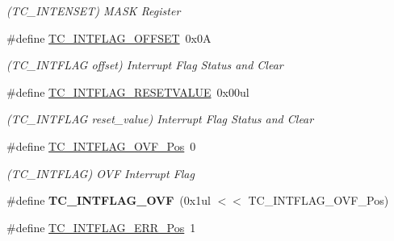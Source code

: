 \begin{DoxyCompactItemize}
\begin{DoxyCompactList}\small\item\em (T\+C\+\_\+\+I\+N\+T\+E\+N\+S\+E\+T) M\+A\+S\+K Register \end{DoxyCompactList}\item 
\hypertarget{group___s_a_m_l21___t_c_ga82798e90146a8ab84dce2f0885671f99}{}\#define \hyperlink{group___s_a_m_l21___t_c_ga82798e90146a8ab84dce2f0885671f99}{T\+C\+\_\+\+I\+N\+T\+F\+L\+A\+G\+\_\+\+O\+F\+F\+S\+E\+T}~0x0\+A\label{group___s_a_m_l21___t_c_ga82798e90146a8ab84dce2f0885671f99}

\begin{DoxyCompactList}\small\item\em (T\+C\+\_\+\+I\+N\+T\+F\+L\+A\+G offset) Interrupt Flag Status and Clear \end{DoxyCompactList}\item 
\hypertarget{group___s_a_m_l21___t_c_ga8756d3d09dc60b72e74b9850c06b3643}{}\#define \hyperlink{group___s_a_m_l21___t_c_ga8756d3d09dc60b72e74b9850c06b3643}{T\+C\+\_\+\+I\+N\+T\+F\+L\+A\+G\+\_\+\+R\+E\+S\+E\+T\+V\+A\+L\+U\+E}~0x00ul\label{group___s_a_m_l21___t_c_ga8756d3d09dc60b72e74b9850c06b3643}

\begin{DoxyCompactList}\small\item\em (T\+C\+\_\+\+I\+N\+T\+F\+L\+A\+G reset\+\_\+value) Interrupt Flag Status and Clear \end{DoxyCompactList}\item 
\hypertarget{group___s_a_m_l21___t_c_ga08dac8ece84bf05f3d87c18dabf060cb}{}\#define \hyperlink{group___s_a_m_l21___t_c_ga08dac8ece84bf05f3d87c18dabf060cb}{T\+C\+\_\+\+I\+N\+T\+F\+L\+A\+G\+\_\+\+O\+V\+F\+\_\+\+Pos}~0\label{group___s_a_m_l21___t_c_ga08dac8ece84bf05f3d87c18dabf060cb}

\begin{DoxyCompactList}\small\item\em (T\+C\+\_\+\+I\+N\+T\+F\+L\+A\+G) O\+V\+F Interrupt Flag \end{DoxyCompactList}\item 
\hypertarget{group___s_a_m_l21___t_c_ga5cb3edbf83c163618938ea80559e1e12}{}\#define {\bfseries T\+C\+\_\+\+I\+N\+T\+F\+L\+A\+G\+\_\+\+O\+V\+F}~(0x1ul $<$$<$ T\+C\+\_\+\+I\+N\+T\+F\+L\+A\+G\+\_\+\+O\+V\+F\+\_\+\+Pos)\label{group___s_a_m_l21___t_c_ga5cb3edbf83c163618938ea80559e1e12}

\item 
\hypertarget{group___s_a_m_l21___t_c_ga62b71a1389f803452a9d1c1b56c3acc2}{}\#define \hyperlink{group___s_a_m_l21___t_c_ga62b71a1389f803452a9d1c1b56c3acc2}{T\+C\+\_\+\+I\+N\+T\+F\+L\+A\+G\+\_\+\+E\+R\+R\+\_\+\+Pos}~1\label{group___s_a_m_l21___t_c_ga62b71a1389f803452a9d1c1b56c3acc2}


\end{DoxyCompactItemize}

